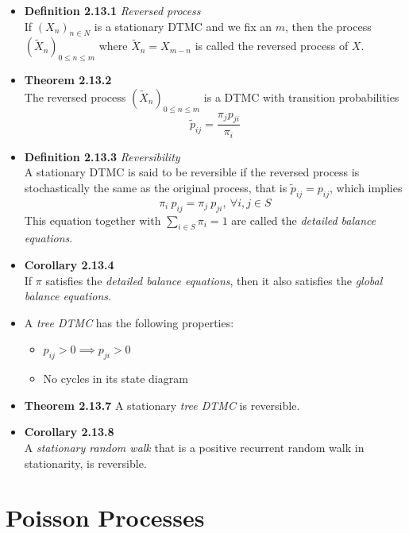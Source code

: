 \documentclass[11pt,a4paper]{article}
\begin{document}
\begin{itemize}
    \item \textbf{Definition 2.13.1} \emph{Reversed process} \\
        If ${(X_n)}_{n \in N}$ is a stationary DTMC and we fix an $m$, then the process
        ${(\widetilde{X}_n)}_{0 \leq n \leq m}$ where $\widetilde{X}_n = X_{m-n}$
        is called the reversed process of $X$.
    \item \textbf{Theorem 2.13.2} \\
        The reversed process ${(\widetilde{X}_n)}_{0 \leq n \leq m}$
        is a DTMC with transition probabilities
        \[
            \widetilde{p}_{ij} = \frac{ {\pi_j} {p_{ji}} }{\pi_i}
        \]
    \item \textbf{Definition 2.13.3} \emph{Reversibility} \\
        A stationary DTMC is said to be reversible if the reversed process is stochastically the
        same as the original process,
        that is $\widetilde{p}_{ij} = p_{ij}$, which implies
        \[
            \pi_i \ p_{ij} = \pi_j \ p_{ji}, \ \forall i, j \in S
        \]
        This equation together with $\sum_{i \in S} \pi_i = 1$
        are called the \emph{detailed balance equations}.
    \item \textbf{Corollary 2.13.4} \\
        If $\pi$ satisfies the \emph{detailed balance equations}, then it also satisfies the
        \emph{global balance equations}.
    \item A \emph{tree DTMC} has the following properties:
        \begin{itemize}
            \item $p_{ij} > 0 \implies p_{ji} > 0$
            \item No cycles in its state diagram
        \end{itemize}
    \item \textbf{Theorem 2.13.7} A stationary \emph{tree DTMC} is reversible.
    \item \textbf{Corollary 2.13.8} \\
        A \emph{stationary random walk} that is a positive recurrent random walk in stationarity,
        is reversible.
\end{itemize}

\section{Poisson Processes}
\end{document}
